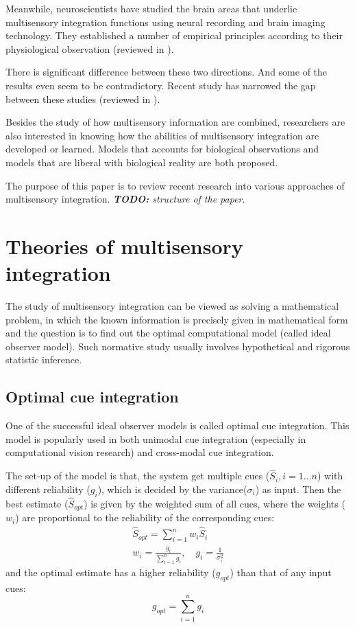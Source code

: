 \documentclass{article}[11pt]
\newcommand{\TODO}[1]{\emph{\small{{\bf TODO: } #1}}}
\begin{document}
Meanwhile, neuroscientists have studied the brain areas that underlie multisensory integration functions using neural recording and brain imaging technology. They established a number of empirical principles according to their physiological observation (reviewed in \cite{stein_multisensory_2008}).

There is significant difference between these two directions. And some of the results even seem to be contradictory. Recent study has narrowed the gap between these studies (reviewed in \cite{fetsch_bridging_2013}).

Besides the study of how multisensory information are combined, researchers are also interested in knowing how the abilities of multisensory integration are developed or learned. Models that accounts for biological observations and models that are liberal with biological reality are both proposed.

The purpose of this paper is to review recent research into various approaches of multisensory integration.
\TODO{structure of the paper}.

\section{Theories of multisensory integration}
The study of multisensory integration can be viewed as solving a mathematical problem, in which the known information is precisely given in mathematical form and the question is to find out the optimal computational model (called ideal observer model). Such normative study usually involves hypothetical and rigorous statistic inference.

\subsection{Optimal cue integration}
One of the successful ideal observer models is called optimal cue integration\cite{geisler_contributions_2011}. This model is popularly used in both unimodal cue integration (especially in computational vision research) and cross-modal cue integration.

The set-up of the model is that, the system get multiple cues ($\hat{S}_i, i=1 \dots n$) with different reliability ($g_i$), which is decided by the variance($\sigma_i$) as input. Then the best estimate ($\hat{S}_{opt}$) is given by the weighted sum of all cues, where the weights ($w_i$) are proportional to the reliability of the corresponding cues:
\begin{gather}
  \hat{S}_{opt} = \sum_{i=1}^{n} w_i \hat{S}_i \label{eq:optest} \\
  w_i = \frac{g_i}{\sum_{i=1}^{n} g_i}, \quad g_i = \frac{1}{\sigma_i^2} \label{eq:optweight}
\end{gather}
and the optimal estimate has a higher reliability ($g_{opt}$) than that of any input cues:
\begin{equation}
  g_{opt} = \sum_{i=1}^{n} g_i \label{eq:optrel}
\end{equation}
\end{document}
